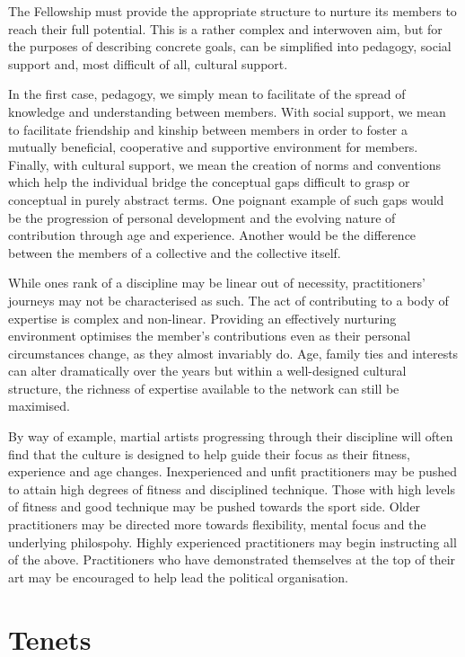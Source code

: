 \documentclass[9pt,oneside]{amsart}
\begin{document}
The Fellowship must provide the appropriate structure to nurture its members to reach their full potential. This is a rather complex and interwoven aim, but for the purposes of describing concrete goals, can be simplified into pedagogy, social support and, most difficult of all, cultural support.

In the first case, pedagogy, we simply mean to facilitate of the spread of knowledge and understanding between members. With social support, we mean to facilitate friendship and kinship between members in order to foster a mutually beneficial, cooperative and supportive environment for members. Finally, with cultural support, we mean the creation of norms and conventions which help the individual bridge the conceptual gaps difficult to grasp or conceptual in purely abstract terms. One poignant example of such gaps would be the progression of personal development and the evolving nature of contribution through age and experience. Another would be the difference between the members of a collective and the collective itself.

While ones rank of a discipline may be linear out of necessity, practitioners' journeys may not be  characterised as such. The act of contributing to a body of expertise is complex and non-linear. Providing an effectively nurturing environment optimises the member's contributions even as their personal circumstances change, as they almost invariably do. Age, family ties and interests can alter dramatically over the years but within a well-designed cultural structure, the richness of expertise available to the network can still be maximised.

By way of example, martial artists progressing through their discipline will often find that the culture is designed to help guide their focus as their fitness, experience and age changes. Inexperienced and unfit practitioners may be pushed to attain high degrees of fitness and disciplined technique. Those with high levels of fitness and good technique may be pushed towards the sport side. Older practitioners may be directed more towards flexibility, mental focus and the underlying philospohy. Highly experienced practitioners may begin instructing all of the above. Practitioners who have demonstrated themselves at the top of their art may be encouraged to help lead the political organisation.

\section{Tenets}
\end{document}
